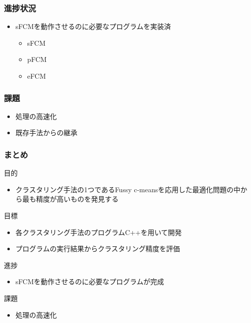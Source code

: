 \documentclass[13pt,dvipdfmx]{beamer}
\begin{document}
\begin{frame}\frametitle{進捗状況}
\begin{itemize}
 \item sFCMを動作させるのに必要なプログラムを実装済
       \begin{itemize}
       \item sFCM
       \item pFCM
       \item eFCM
       \end{itemize}
\end{itemize}
\end{frame}

\begin{frame}\frametitle{課題}
\begin{itemize}
\item 処理の高速化
\item 既存手法からの継承
\end{itemize}
\end{frame}

\begin{frame}\frametitle{まとめ}
  \begin{block}{目的}
    \begin{itemize}
    \item クラスタリング手法の1つであるFussy c-meansを応用した最適化問題の中から最も精度が高いものを発見する
    \end{itemize}
  \end{block}
  \begin{block}{目標}
    \begin{itemize}
    \item 各クラスタリング手法のプログラムC++を用いて開発
    \item プログラムの実行結果からクラスタリング精度を評価
    \end{itemize}
  \end{block}
  \begin{block}{進捗}
    \begin{itemize}
    \item sFCMを動作させるのに必要なプログラムが完成
    \end{itemize}
  \end{block}
  \begin{block}{課題}
    \begin{itemize}
    \item 処理の高速化
    \end{itemize}
  \end{block}
\end{frame}
\end{document}
